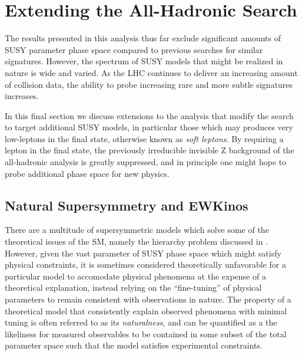 \chapter{Extending the All-Hadronic Search}
\label{ch:soft}

The results presented in this analysis thus far exclude significant amounts of SUSY parameter phase space compared to previous searches for similar signatures. However, the spectrum of SUSY models that might be realized in nature is wide and varied. As the LHC continues to deliver an increasing amount of collision data, the ability to probe increasing rare and more subtle signatures increases. 

In this final section we discuss extensions to the \mttwo analysis that modify the search to target additional SUSY models, in particular those which may produces very low-\pt leptons in the final state, otherwise known as {\it soft leptons}. By requiring a lepton in the final state, the previously irreducible invisible Z background of the all-hadronic analysis is greatly suppressed, and in principle one might hope to probe additional phase space for new physics.

\section{Natural Supersymmetry and EWKinos}
\label{sec:natural}

There are a multitude of supersymmetric models which solve some of the theoretical issues of the SM, namely the hierarchy problem discussed in . However, given the vast parameter of SUSY phase space which might satisfy physical constraints, it is sometimes considered theoretically unfavorable for a particular model to accomodate physical phenomena at the expense of a theoretical explanation, instead relying on the ``fine-tuning'' of physical parameters to remain consistent with observations in nature. The property of a theoretical model that consistently explain observed phenomena with minimal tuning is often referred to as its {\it naturalness}, and can be quantified as a the likeliness for measured observables to be contained in some subset of the total parameter space such that the model satisfies experimental constraints.

